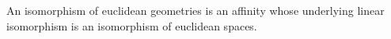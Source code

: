 An isomorphism of euclidean geometries is an affinity whose underlying linear isomorphism is an isomorphism of euclidean spaces.
